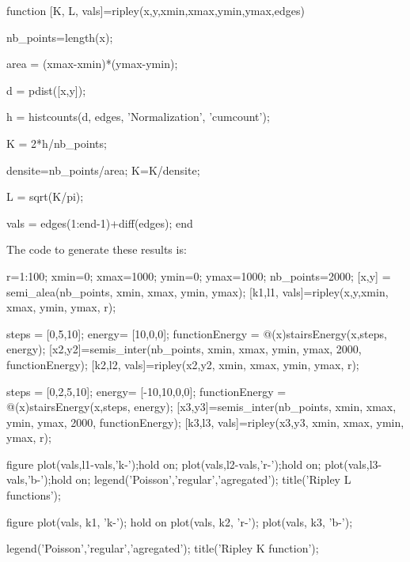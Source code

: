 \begin{matlab}
function [K, L, vals]=ripley(x,y,xmin,xmax,ymin,ymax,edges)

nb_points=length(x);

area = (xmax-xmin)*(ymax-ymin);

d = pdist([x,y]);

h = histcounts(d, edges, 'Normalization', 'cumcount');

K = 2*h/nb_points;

densite=nb_points/area;
K=K/densite;

L = sqrt(K/pi);

vals = edges(1:end-1)+diff(edges);
end %
\end{matlab}

The code to generate these results is:
\begin{matlab}
r=1:100;
xmin=0; xmax=1000; ymin=0; ymax=1000;
nb_points=2000;
[x,y] = semi_alea(nb_points, xmin, xmax, ymin, ymax);
[k1,l1, vals]=ripley(x,y,xmin, xmax, ymin, ymax, r);

steps = [0,5,10];
energy= [10,0,0];
functionEnergy = @(x)stairsEnergy(x,steps, energy);
[x2,y2]=semis_inter(nb_points, xmin, xmax, ymin, ymax, 2000, functionEnergy);
[k2,l2, vals]=ripley(x2,y2, xmin, xmax, ymin, ymax, r);


steps = [0,2,5,10];
energy= [-10,10,0,0];
functionEnergy = @(x)stairsEnergy(x,steps, energy);
[x3,y3]=semis_inter(nb_points, xmin, xmax, ymin, ymax, 2000, functionEnergy);
[k3,l3, vals]=ripley(x3,y3, xmin, xmax, ymin, ymax, r);

figure
plot(vals,l1-vals,'k-');hold on;
plot(vals,l2-vals,'r-');hold on;
plot(vals,l3-vals,'b-');hold on;
legend('Poisson','regular','agregated');
title('Ripley L functions');

figure
plot(vals, k1, 'k-'); hold on
plot(vals, k2, 'r-'); 
plot(vals, k3, 'b-');

legend('Poisson','regular','agregated');
title('Ripley K function');
\end{matlab}


